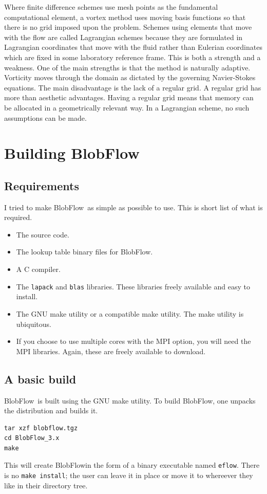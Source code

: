 \documentclass[12pt]{report}
\newcommand{\BF}{BlobFlow}
\begin{document}
Where finite
difference schemes use mesh points as the fundamental computational element,
a vortex method uses moving basis functions so that there is no grid imposed
upon the problem.  Schemes using elements that move with the flow are called
Lagrangian schemes because they are formulated in Lagrangian coordinates
that move with the fluid rather than Eulerian coordinates which are fixed in
some laboratory reference frame.  This is both a strength and a weakness.
One of the main strengths is that the method is naturally adaptive.
Vorticity moves through the domain as dictated by the governing
Navier-Stokes equations.  The main disadvantage is the lack of a regular
grid.  A regular grid has more than aesthetic advantages.  Having a regular
grid means that memory can be allocated in a geometrically relevant way.
In a Lagrangian scheme, no such assumptions can be made.

\chapter{Building \BF}

\section{Requirements}

I tried to make \BF~as simple as possible to use.  This is short list of what
is required.

\begin{itemize}
\item The source code.
\item The lookup table binary files for \BF.
 \item A C compiler.
\item The \texttt{lapack} and \texttt{blas} libraries.  These libraries freely
available and easy to install.
\item The GNU make utility or a compatible make utility.  The make utility is
ubiquitous.
\item If you choose to use multiple cores with the MPI option, you will need
the MPI libraries.  Again, these are freely available to download.
\end{itemize}


\section{A basic build}

\BF~is built using the GNU make utility.  To build \BF, one unpacks the
distribution
and builds it.
\begin{verbatim}
tar xzf blobflow.tgz
cd BlobFlow_3.x
make
\end{verbatim}
This will create \BF in the form of a binary executable named {\tt eflow}. 
There is no {\tt make install}; the user can leave it in place or move it to
whereever they like in their directory tree.
\end{document}

